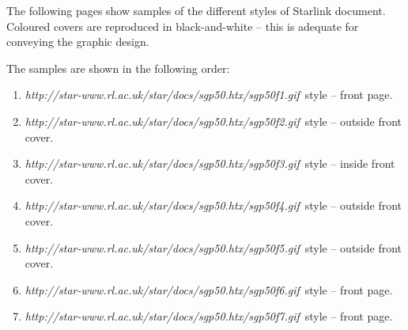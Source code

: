The following pages show samples of the different styles of Starlink document.
Coloured covers are reproduced in black-and-white -- this is adequate for
conveying the graphic design.

The samples are shown in the following order:
\begin{enumerate}
\item {\em 
 {http://star-www.rl.ac.uk/star/docs/sgp50.htx/sgp50f1.gif}}\, style --
 front page.
\item {\em
 {http://star-www.rl.ac.uk/star/docs/sgp50.htx/sgp50f2.gif}}\, style --
 outside front cover.
\item {\em 
 {http://star-www.rl.ac.uk/star/docs/sgp50.htx/sgp50f3.gif}}\, style --
 inside front cover.
\item {\em 
 {http://star-www.rl.ac.uk/star/docs/sgp50.htx/sgp50f4.gif}}\, style --
 outside front cover.
\item {\em 
  {http://star-www.rl.ac.uk/star/docs/sgp50.htx/sgp50f5.gif}}\, style --
 outside front cover.
\item {\em 
  {http://star-www.rl.ac.uk/star/docs/sgp50.htx/sgp50f6.gif}}\, style --
 front page.
\item {\em 
 {http://star-www.rl.ac.uk/star/docs/sgp50.htx/sgp50f7.gif}}\, style -- 
 front page.
\end{enumerate}


